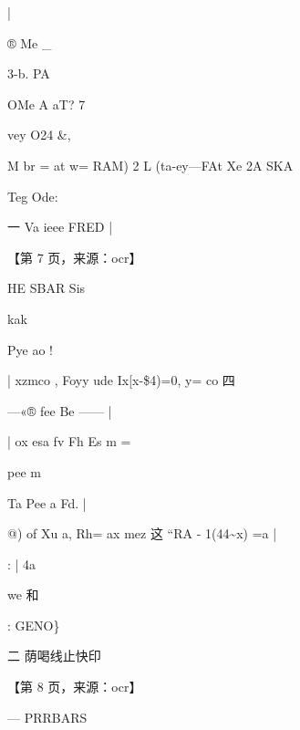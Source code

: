 \documentclass[UTF8,12pt,a4paper,openany]{ctexbook}
\begin{document}
\begin{enumerate}[label=\textbf{\arabic*.},leftmargin=2em]
                                                        |\par ® Me                                                  \_\par 3-b.               PA\par OMe      A          aT?                               7\par vey O24                                                                                \&,\par M br =  at w= RAM) 2 L (ta-ey—FAt Xe 2A SKA\par Teg              Ode:\par 一    Va          ieee FRED |\par \par 【第 7 页，来源：ocr】\par HE SBAR Sis\par kak\par Pye ao                                                    !\par |    xzmco , Foyy ude Ix[x-\$4)=0, y= co 四\par —«® fee             Be         ——  |\par |    ox esa fv       Fh            Es m =\par pee                                    m\par Ta Pee a                         Fd.        |\par @) of Xu a,   Rh= ax  mez  这 “RA -  1(44\textasciitilde{}x) =a                 |\par : |                                        4a\par we 和\par :                                                        GENO\}\par 二                             荫喝线止快印\par \par 【第 8 页，来源：ocr】\par —      PRRBARS

\end{enumerate}
\end{document}
